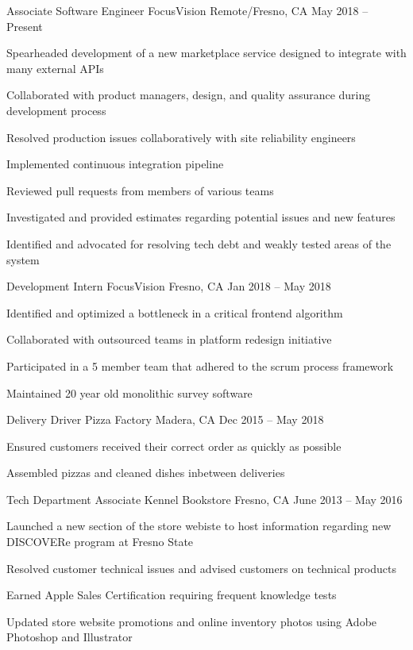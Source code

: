 \documentclass[]{awesome-cv}
\begin{document}
\vspace{-2mm}
\begin{cventries}
	\cventry
	{Associate Software Engineer}
	{FocusVision}
	{Remote/Fresno, CA}
	{May 2018 – Present}
	{\begin{cvitems}
		\item {Spearheaded development of a new marketplace service designed to integrate with many external APIs}
		\item {Collaborated with product managers, design, and quality assurance during development process}
		\item {Resolved production issues collaboratively with site reliability engineers}
		\item {Implemented continuous integration pipeline}
		\item {Reviewed pull requests from members of various teams}
		\item {Investigated and provided estimates regarding potential issues and new features}
		\item {Identified and advocated for resolving tech debt and weakly tested areas of the system}
		\end{cvitems}}
	\cventry
	{Development Intern}
	{FocusVision}
	{Fresno, CA}
	{Jan 2018 – May 2018}
	{\begin{cvitems}
		\item {Identified and optimized a bottleneck in a critical frontend algorithm}
		\item {Collaborated with outsourced teams in platform redesign initiative}
		\item {Participated in a 5 member team that adhered to the scrum process framework}
		\item {Maintained 20 year old monolithic survey software}
		\end{cvitems}}
	\cventry
	{Delivery Driver}
	{Pizza Factory}
	{Madera, CA}
	{Dec 2015 – May 2018}
	{\begin{cvitems}
		\item {Ensured customers received their correct order as quickly as possible}
		\item {Assembled pizzas and cleaned dishes inbetween deliveries}
		\end{cvitems}}
	\cventry
	{Tech Department Associate}
	{Kennel Bookstore}
	{Fresno, CA}
	{June 2013 – May 2016}
	{\begin{cvitems}
		\item {Launched a new section of the store webiste to host information regarding new DISCOVERe program at Fresno State}
		\item {Resolved customer technical issues and advised customers on technical products}
		\item {Earned Apple Sales Certification requiring frequent knowledge tests}
		\item {Updated store website promotions and online inventory photos using Adobe Photoshop and Illustrator}
		\end{cvitems}}
\end{cventries}
\end{document}
